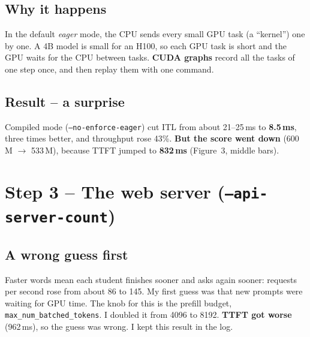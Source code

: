 \documentclass[10pt,a4paper]{article}
\newcommand{\knob}[1]{\texttt{\textcolor{accent}{#1}}}
\begin{document}
\subsection{Why it happens}
In the default \emph{eager} mode, the CPU sends every small GPU task (a ``kernel'') one by one. A 4B model is small for an H100, so each GPU task is short and the GPU waits for the CPU between tasks. \textbf{CUDA graphs} record all the tasks of one step once, and then replay them with one command.

\begin{center}
\end{center}

\subsection{Result -- a surprise}
Compiled mode (\knob{--no-enforce-eager}) cut ITL from about 21--25\,ms to \textbf{8.5\,ms}, three times better, and throughput rose 43\%. \textbf{But the score went down} (600\,M $\rightarrow$ 533\,M), because TTFT jumped to \textbf{832\,ms} (Figure~3, middle bars).

\section{Step 3 -- The web server (\texttt{--api-server-count})}
\subsection{A wrong guess first}
Faster words mean each student finishes sooner and asks again sooner: requests per second rose from about 86 to 145. My first guess was that new prompts were waiting for GPU time. The knob for this is the prefill budget,\\ \knob{max\_num\_batched\_tokens}. I doubled it from 4096 to 8192. \textbf{TTFT got worse} (962\,ms), so the guess was wrong. I kept this result in the log.
\end{document}
